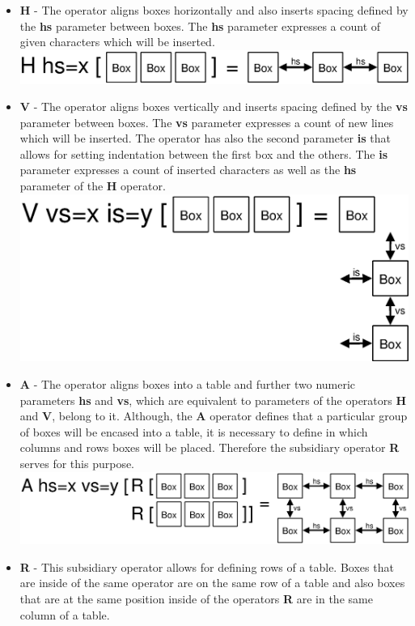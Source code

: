 \documentclass[12pt,notitlepage,a4paper]{report}
\begin{document}
\begin{itemize}
\item \textbf{H} - The operator aligns boxes horizontally and also inserts spacing defined by the \textbf{hs} parameter between boxes. The \textbf{hs} parameter expresses a count of given characters which will be inserted.
\includegraphics[scale=0.4]{pictures/StrategoXT-H.eps}
\item \textbf{V} - The operator aligns boxes vertically and inserts spacing defined by the \textbf{vs} parameter between boxes. The \textbf{vs} parameter expresses a count of new lines which will be inserted. The operator has also the second parameter \textbf{is} that allows for setting indentation between the first box and the others. The \textbf{is} parameter expresses a count of inserted characters as well as the \textbf{hs} parameter of the \textbf{H} operator.
\includegraphics[scale=0.4]{pictures/StrategoXT-V.eps}
\item \textbf{A} - The operator aligns boxes into a table and further two numeric parameters \textbf{hs} and \textbf{vs}, which are equivalent to parameters of the operators \textbf{H} and \textbf{V}, belong to it. Although, the \textbf{A} operator defines that a particular group of boxes will be encased into a table, it is necessary to define in which columns and rows  boxes will be placed. Therefore the subsidiary operator \textbf{R}  serves for this purpose.
\includegraphics[scale=0.4]{pictures/StrategoXT-A.eps}
\item \textbf{R} - This subsidiary operator allows for defining rows of a table. Boxes that are inside of the same operator are on the same row of a table and also boxes that are at the same position inside of the operators \textbf{R} are in the same column of a table.
\end{itemize}
\end{document}
